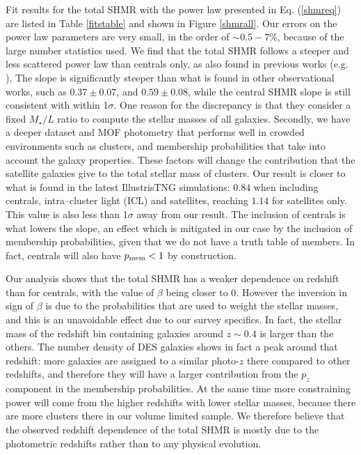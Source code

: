 {Fit results for the total SHMR with the power law presented in Eq. (\ref{shmreq}) are listed in Table \ref{fitstable} and shown in Figure \ref{shmrall}. Our errors on the power law parameters are very small, in the order of $\sim 0.5-7 \%$, because of the large number statistics used. We find that the total SHMR follows a steeper and less scattered power law than centrals only, as also found in previous works (e.g. \citealt{illustris}). 
The slope is significantly steeper than what is found in other observational works, such as \citet{andreon12} $0.37\pm0.07$, and \citet{kravtsov} $0.59\pm 0.08$, while the central SHMR slope is still consistent with \citet{kravtsov} within 1$\sigma$. One reason for the discrepancy is that they consider a fixed $M_\star/L$ ratio to compute the stellar masses of all galaxies. Secondly, we have a deeper dataset and MOF photometry that performs well in crowded environments such as clusters, and membership probabilities that take into account the galaxy properties. These factors will change the contribution that the satellite galaxies give to the total stellar mass of clusters. Our result is closer to what is found in the latest IllustrisTNG simulations: $0.84$ when including centrals, intra--cluster light (ICL) and satellites, reaching $1.14$ for satellites only. This value is also less than 1$\sigma$ away from our result. The inclusion of centrals is what lowers the slope, an effect which is mitigated in our case by the inclusion of membership probabilities, given that we do not have a truth table of members. In fact, centrals will also have $p_{\rm mem}<1$ by construction.

Our analysis shows that the total SHMR has a weaker dependence on redshift than for centrals, with the value of $\beta$ being closer to 0. However the inversion in sign of $\beta$ is due to the probabilities that are used to weight the stellar masses, and this is an unavoidable effect due to our survey specifics. In fact, the stellar mass of the redshift bin containing galaxies around $z\sim 0.4$ is larger than the others. The number density of DES galaxies shows in fact a peak around that redshift: more galaxies are assigned to a similar photo-$z$ there compared to other redshifts, and therefore they will have a larger contribution from the $p_{z}$ component in the membership probabilities. At the same time more constraining power will come from the higher redshifts with lower stellar masses, because there are more clusters there in our volume limited sample. We therefore believe that the observed redshift dependence of the total SHMR is mostly due to the photometric redshifts rather than to any physical evolution.

}
